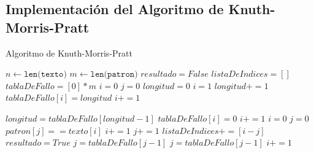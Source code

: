 \subsection*{Implementación del Algoritmo de Knuth-Morris-Pratt}
\begin{algorithm} [H]
    \caption{Algoritmo de Knuth-Morris-Pratt}\label{alg:KMP}
    \begin{algorithmic} [1]
            \State $n \gets \texttt{len(texto)}$
            \State $m \gets \texttt{len(patron)}$
            \State $resultado = False$
            \State $listaDeIndices = []$
            \State $tablaDeFallo = [0]*m$ 
            \State $i = 0$
            \State $j = 0$
                \State $longitud = 0$ 
                \State $i = 1$
                        \State $longitud += 1$
                        \State $tablaDeFallo[i] = longitud$
                        \State $i += 1$
                    
                    \Else 
                            \State $longitud = tablaDeFallo[longitud-1]$
                        \Else
                            \State $tablaDeFallo[i] = 0$
                            \State $i += 1$
                        \EndIf
                    \EndIf
                \EndWhile
            \EndProcedure
                \State $i = 0$
                \State $j = 0$
                    \If $patron[j] == texto[i]$
                        \State $i += 1$
                        \State $j += 1$
                    \EndIf
                        \State $listaDeIndices += [i-j]$
                        \State $resultado = True$
                        \State $j = tablaDeFallo[j-1]$
                            \State $j = tablaDeFallo[j-1]$
                        \Else 
                            \State $i += 1$
                        \EndIf
    \end{algorithmic}
\end{algorithm}

